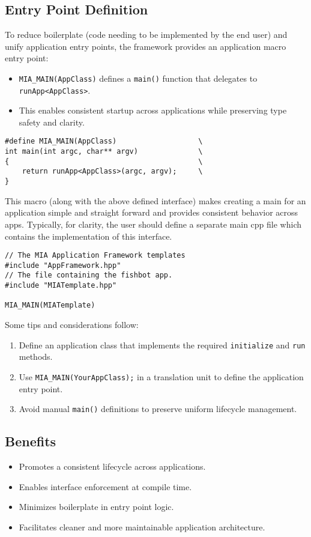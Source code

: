 \subsection*{Entry Point Definition}
To reduce boilerplate (code needing to be implemented by the end user) and unify application entry points, the framework provides an application macro entry point:
\begin{itemize}
	\item \texttt{MIA\_MAIN(AppClass)} defines a \texttt{main()} function that delegates to \texttt{runApp<AppClass>}.
	\item This enables consistent startup across applications while preserving type safety and clarity.
\end{itemize}
\begin{lstlisting}[style=cppstyle]
#define MIA_MAIN(AppClass)                   \
int main(int argc, char** argv)              \
{                                            \
    return runApp<AppClass>(argc, argv);     \
}
\end{lstlisting}
This macro (along with the above defined interface) makes creating a main for an application simple and straight forward and provides consistent behavior across apps. Typically, for clarity, the user should define a separate main cpp file which contains the implementation of this interface.
\begin{lstlisting}[style=cppstyle]
// The MIA Application Framework templates
#include "AppFramework.hpp"
// The file containing the fishbot app.
#include "MIATemplate.hpp"

MIA_MAIN(MIATemplate)
\end{lstlisting}
Some tips and considerations follow:
\begin{enumerate}
	\item Define an application class that implements the required \texttt{initialize} and \texttt{run} methods.
	\item Use \texttt{MIA\_MAIN(YourAppClass);} in a translation unit to define the application entry point.
	\item Avoid manual \texttt{main()} definitions to preserve uniform lifecycle management.
\end{enumerate}

\subsection*{Benefits}
\begin{itemize}
	\item Promotes a consistent lifecycle across applications.
	\item Enables interface enforcement at compile time.
	\item Minimizes boilerplate in entry point logic.
	\item Facilitates cleaner and more maintainable application architecture.
\end{itemize}











